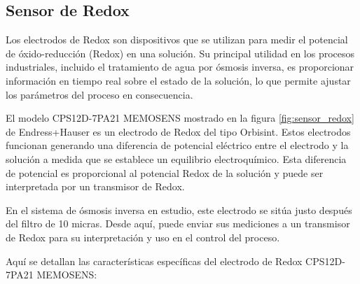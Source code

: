\subsection{Sensor de Redox} \label{sec:sensor_redox}

Los electrodos de Redox son dispositivos que se utilizan para medir el potencial de óxido-reducción (Redox) en una
solución. Su principal utilidad en los procesos industriales, incluido el tratamiento de agua por ósmosis inversa,
es proporcionar información en tiempo real sobre el estado de la solución, lo que permite ajustar los parámetros
del proceso en consecuencia.

El modelo CPS12D-7PA21 MEMOSENS mostrado en la figura \ref{fig:sensor_redox} de Endress+Hauser es un electrodo de Redox del tipo Orbisint. Estos electrodos
funcionan generando una diferencia de potencial eléctrico entre el electrodo y la solución a medida que se establece
un equilibrio electroquímico. Esta diferencia de potencial es proporcional al potencial Redox de la solución y puede
ser interpretada por un transmisor de Redox.

En el sistema de ósmosis inversa en estudio, este electrodo
se sitúa justo después del filtro de 10 micras. Desde aquí, puede enviar sus mediciones a un transmisor de
Redox para su interpretación y uso en el control del proceso.



Aquí se detallan las características específicas del electrodo de Redox CPS12D-7PA21 MEMOSENS:\\

